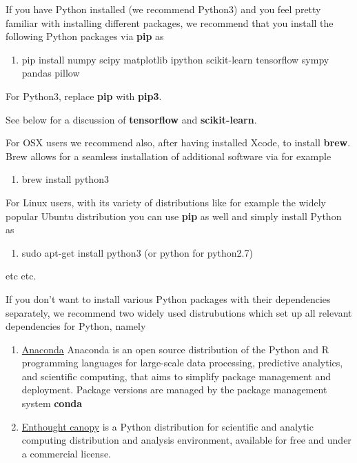 \documentclass[%
oneside,                 %
final,                   %
10pt]{article}
\begin{document}
If you have Python installed (we recommend Python3) and you feel pretty familiar with installing different packages, 
we recommend that you install the following Python packages via \textbf{pip} as
\begin{enumerate}
\item pip install numpy scipy matplotlib ipython scikit-learn tensorflow sympy pandas pillow
\end{enumerate}

\noindent
For Python3, replace \textbf{pip} with \textbf{pip3}.

See below for a discussion of \textbf{tensorflow} and \textbf{scikit-learn}. 

For OSX users we recommend also, after having installed Xcode, to install \textbf{brew}. Brew allows 
for a seamless installation of additional software via for example
\begin{enumerate}
\item brew install python3
\end{enumerate}

\noindent
For Linux users, with its variety of distributions like for example the widely popular Ubuntu distribution
you can use \textbf{pip} as well and simply install Python as 
\begin{enumerate}
\item sudo apt-get install python3  (or python for python2.7)
\end{enumerate}

\noindent
etc etc. 

If you don't want to install various Python packages with their dependencies separately, we recommend two widely used distrubutions which set up  all relevant dependencies for Python, namely
\begin{enumerate}
\item \href{{https://docs.anaconda.com/}}{Anaconda} Anaconda is an open source distribution of the Python and R programming languages for large-scale data processing, predictive analytics, and scientific computing, that aims to simplify package management and deployment. Package versions are managed by the package management system \textbf{conda}

\item \href{{https://www.enthought.com/product/canopy/}}{Enthought canopy}  is a Python distribution for scientific and analytic computing distribution and analysis environment, available for free and under a commercial license.
\end{enumerate}
\end{document}
